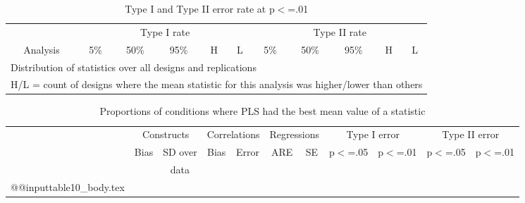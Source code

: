 \documentclass[10pt]{a0poster}
\begin{document}
\begin{table}[ht]
\begin{center}
\caption{Type I and Type II error rate at p$<$=.01}
\begin{tabular}{lrrrrrrrrrr}
\toprule
&\multicolumn{5}{c}{Type I rate}&\multicolumn{5}{c}{Type II rate} \\
\cmidrule(l{.75em}){2-6}\cmidrule(l{.75em}){7-11}
\multicolumn{1}{c}{Analysis}&\multicolumn{1}{c}{5\%}&\multicolumn{1}{c}{50\%}&\multicolumn{1}{c}{95\%}&\multicolumn{1}{c}{H}&\multicolumn{1}{c}{L}&\multicolumn{1}{c}{5\%}&\multicolumn{1}{c}{50\%}&\multicolumn{1}{c}{95\%}&\multicolumn{1}{c}{H}&\multicolumn{1}{c}{L} \\
\midrule

\bottomrule
\multicolumn{11}{l}{\footnotesize{Distribution of statistics over all designs and replications}} \\
\multicolumn{11}{l}{\footnotesize{H/L = count of designs where the mean statistic for this analysis was higher/lower than others}} \\
\end{tabular}
\end{center}
\end{table}


\begin{table}[ht]
\begin{center}
\caption{Proportions of conditions where PLS had the best mean value of a statistic}
\begin{tabular}{lrrrrrrrrrr}
 \toprule
&\multicolumn{2}{c}{Constructs}&\multicolumn{2}{c}{Correlations}&\multicolumn{2}{c}{Regressions}&\multicolumn{2}{c}{Type I error}&\multicolumn{2}{c}{Type II error}\\
\cmidrule(l{.75em}){2-3}\cmidrule(l{.75em}){4-5}\cmidrule(l{.75em}){6-7}\cmidrule(l{.75em}){8-9}\cmidrule(l{.75em}){10-11}
&\multicolumn{1}{c}{Bias}&\multicolumn{1}{c}{SD over}&\multicolumn{1}{c}{Bias}&\multicolumn{1}{c}{Error}&\multicolumn{1}{c}{ARE}&\multicolumn{1}{c}{SE}&\multicolumn{1}{c}{p$<$=.05}&\multicolumn{1}{c}{p$<$=.01}&\multicolumn{1}{c}{p$<$=.05}&\multicolumn{1}{c}{p$<$=.01}\\
&&\multicolumn{1}{c}{data}\\
\midrule
\csname @@input\endcsname table10_body.tex
\bottomrule
\end{tabular}
\end{center}
\end{table}
\end{document}
